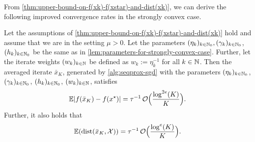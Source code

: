 From \cref{thm:upper-bound-on-f(xk)-f(xstar)-and-dist(xk)}, we can derive the following improved
convergence rates in the strongly convex case.
\begin{corollary}
    \label{cor:convergence-rates-in-expectation}
    Let the assumptions of \cref{thm:upper-bound-on-f(xk)-f(xstar)-and-dist(xk)}
    hold and assume that we are in the setting $\mu > 0$.
    Let the parameters $(\eta_k)_{k\in\mathbb{N}_0}, (\gamma_k)_{k\in\mathbb{N}_0}$, $(h_k)_{k\in\mathbb{N}_0}$
    be the same as in \cref{lem:parameters-for-strongly-convex-case}.
    Further, let the iterate weights $(w_k)_{k\in\mathbb{N}}$
    be defined as $w_k := \eta_k^{-1}$ for all $k\in\mathbb{N}$.
    Then the averaged iterate $\bar{x}_K$,
    generated by \cref{alg:seqprox-sgd} with the parameters $(\eta_k)_{k\in\mathbb{N}_{0}}$,
    $(\gamma_k)_{k\in\mathbb{N}_0}$, $(h_k)_{k\in\mathbb{N}_0}$, $(w_k)_{k\in\mathbb{N}}$, satisfies
    \[
        \mathbb{E}| f(\bar{x}_{K}) - f(x^\star) | = \tau^{-1} \, \mathcal{O} \Big( \frac{\log^{2e}(K)}{K} \Big).
    \]
    Further, it also holds that
    \[
        \mathbb{E}(\operatorname{dist}(\bar{x}_{K}, \mathcal{X})) = \tau^{-1} \, \mathcal{O} \Big( \frac{\log^{e}(K)}{K} \Big).
    \]
\end{corollary}

